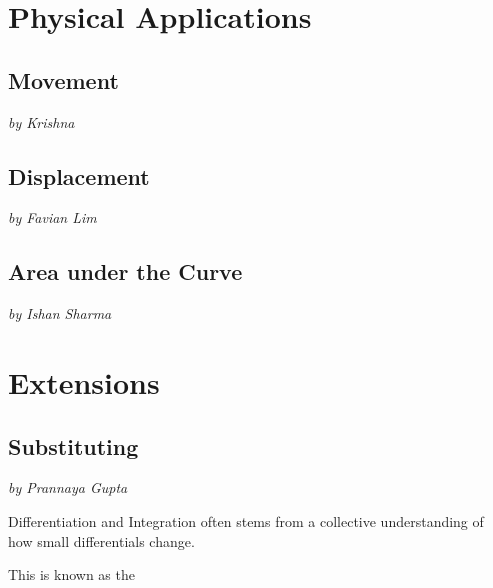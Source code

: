 \documentclass[a4paper,12pt,oneside]{book}
\begin{document}
\part{Physical Applications}

\newpage
\chapter{Movement}
\vspace{-30pt}
\large \textit{by Krishna}


\newpage
\chapter{Displacement}
\vspace{-30pt}
\large \textit{by Favian Lim}


\newpage
\chapter{Area under the Curve}
\vspace{-30pt}
\large \textit{by Ishan Sharma}


\part{Extensions}

\newpage
\chapter{Substituting}
\vspace{-30pt}
\large \textit{by Prannaya Gupta}

Differentiation and Integration often stems from a collective understanding of how small differentials change.

This is known as the 
\end{document}
